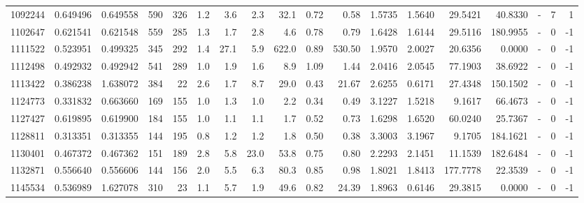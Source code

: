 \begin{tabular}{rrrrrrrrrrrrrrrlrr}
   1092244 & 0.649496 &   0.649558 &  590 &  326 &      1.2 &      3.6 &     2.3 &     32.1 &       0.72 &        0.58 &  1.5735 &  1.5640 &   29.5421 &   40.8330 &             - &        7 &          1 \\
   1102647 & 0.621541 &   0.621548 &  559 &  285 &      1.3 &      1.7 &     2.8 &      4.6 &       0.78 &        0.79 &  1.6428 &  1.6144 &   29.5116 &  180.9955 &             - &        0 &         -1 \\
   1111522 & 0.523951 &   0.499325 &  345 &  292 &      1.4 &     27.1 &     5.9 &    622.0 &       0.89 &      530.50 &  1.9570 &  2.0027 &   20.6356 &    0.0000 &             - &        0 &         -1 \\
   1112498 & 0.492932 &   0.492942 &  541 &  289 &      1.0 &      1.9 &     1.6 &      8.9 &       1.09 &        1.44 &  2.0416 &  2.0545 &   77.1903 &   38.6922 &             - &        0 &         -1 \\
   1113422 & 0.386238 &   1.638072 &  384 &   22 &      2.6 &      1.7 &     8.7 &     29.0 &       0.43 &       21.67 &  2.6255 &  0.6171 &   27.4348 &  150.1502 &             - &        0 &         -1 \\
   1124773 & 0.331832 &   0.663660 &  169 &  155 &      1.0 &      1.3 &     1.0 &      2.2 &       0.34 &        0.49 &  3.1227 &  1.5218 &    9.1617 &   66.4673 &             - &        0 &         -1 \\
   1127427 & 0.619895 &   0.619900 &  184 &  155 &      1.0 &      1.1 &     1.1 &      1.7 &       0.52 &        0.73 &  1.6298 &  1.6520 &   60.0240 &   25.7367 &             - &        0 &         -1 \\
   1128811 & 0.313351 &   0.313355 &  144 &  195 &      0.8 &      1.2 &     1.2 &      1.8 &       0.50 &        0.38 &  3.3003 &  3.1967 &    9.1705 &  184.1621 &             - &        0 &         -1 \\
   1130401 & 0.467372 &   0.467362 &  151 &  189 &      2.8 &      5.8 &    23.0 &     53.8 &       0.75 &        0.80 &  2.2293 &  2.1451 &   11.1539 &  182.6484 &             - &        0 &         -1 \\
   1132871 & 0.556640 &   0.556606 &  144 &  156 &      2.0 &      5.5 &     6.3 &     80.3 &       0.85 &        0.98 &  1.8021 &  1.8413 &  177.7778 &   22.3539 &             - &        0 &         -1 \\
   1145534 & 0.536989 &   1.627078 &  310 &   23 &      1.1 &      5.7 &     1.9 &     49.6 &       0.82 &       24.39 &  1.8963 &  0.6146 &   29.3815 &    0.0000 &             - &        0 &         -1 \\

\end{tabular}
